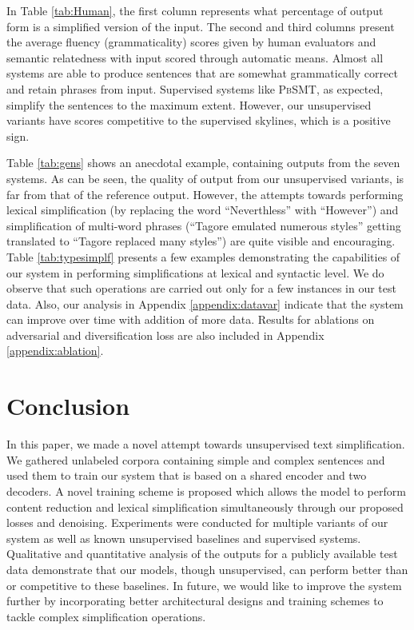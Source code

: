 \documentclass[11pt,a4paper]{article}
\begin{document}
In Table \ref{tab:Human}, the first column represents what percentage of output form is a simplified version of the input. The second and third columns present the average fluency (grammaticality) scores given by human evaluators and semantic relatedness with input scored through automatic means. Almost all systems are able to produce sentences that are somewhat grammatically correct and retain phrases from input. Supervised systems like \textsc{PbSMT}, as expected, simplify the sentences to the maximum extent. However, our unsupervised variants have scores competitive to the supervised skylines, which is a positive sign.

Table \ref{tab:gens} shows an anecdotal example, containing outputs from the seven systems. As can be seen, the quality of output from our unsupervised variants, is far from that of the reference output. However, the attempts towards performing lexical simplification (by replacing the word ``Neverthless'' with ``However'') and simplification of multi-word phrases (``Tagore emulated numerous styles''
getting translated to ``Tagore replaced many styles'') are quite visible and encouraging. Table \ref{tab:typesimplf} presents a few examples demonstrating the capabilities of our system in performing simplifications at lexical and syntactic level. We do observe that such operations are carried out only for a few instances in our test data. Also, our analysis in Appendix \ref{appendix:datavar}  indicate that the system can improve over time with addition of more data. Results for ablations on adversarial and diversification loss are also included in Appendix \ref{appendix:ablation}.  \section{Conclusion}
\label{sec:concl}
In this paper, we made a novel attempt towards unsupervised text simplification. We gathered unlabeled corpora containing simple and complex sentences and used them to train our system that is based on a shared encoder and two decoders. A novel training scheme is proposed which allows the model to perform content reduction and lexical simplification simultaneously through our proposed losses and denoising. Experiments were conducted for multiple variants of our system as well as known unsupervised baselines and supervised systems. Qualitative and quantitative analysis of the outputs for a publicly available test data demonstrate that our models, though unsupervised, can perform better than or competitive to these baselines. In future, we would like to improve the system further by incorporating better architectural designs and training schemes to tackle complex simplification operations. %
\end{document}
